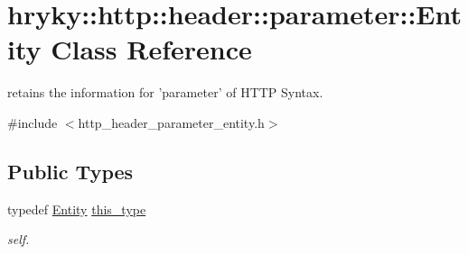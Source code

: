 \hypertarget{classhryky_1_1http_1_1header_1_1parameter_1_1_entity}{\section{hryky\-:\-:http\-:\-:header\-:\-:parameter\-:\-:Entity Class Reference}
\label{classhryky_1_1http_1_1header_1_1parameter_1_1_entity}
}


retains the information for 'parameter' of H\-T\-T\-P Syntax.  




{\ttfamily \#include $<$http\-\_\-header\-\_\-parameter\-\_\-entity.\-h$>$}

\subsection*{Public Types}
\begin{DoxyCompactItemize}
\item 
\hypertarget{classhryky_1_1http_1_1header_1_1parameter_1_1_entity_a038d813a72a33f6d764913045d15120e}{typedef \hyperlink{classhryky_1_1http_1_1header_1_1parameter_1_1_entity}{Entity} \hyperlink{classhryky_1_1http_1_1header_1_1parameter_1_1_entity_a038d813a72a33f6d764913045d15120e}{this\-\_\-type}}\label{classhryky_1_1http_1_1header_1_1parameter_1_1_entity_a038d813a72a33f6d764913045d15120e}

\begin{DoxyCompactList}\small\item\em self. \end{DoxyCompactList}\end{DoxyCompactItemize}
